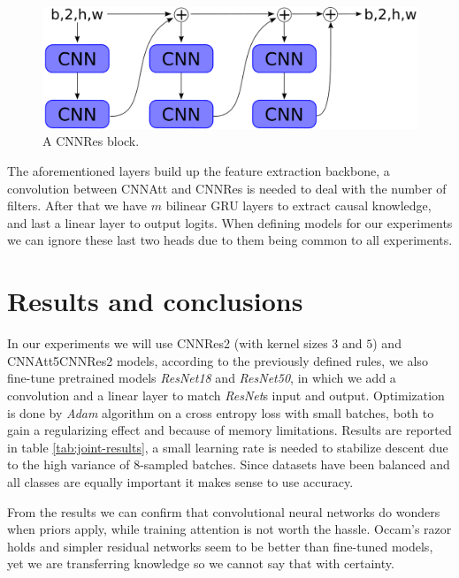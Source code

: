 \documentclass{article}
\begin{document}
\begin{figure}
    \centering
    \includegraphics[scale=.25]{images/cnn_res.png}
    \caption{A CNNRes block.}
    \label{fig:cnnres}
\end{figure}

The aforementioned layers build up the feature extraction backbone, a convolution between CNNAtt and CNNRes is needed to deal with the number of filters.
After that we have $m$ bilinear GRU layers to extract causal knowledge, and last a linear layer to output logits.
When defining models for our experiments we can ignore these last two heads due to them being common to all experiments.

\section{Results and conclusions}
In our experiments we will use CNNRes2 (with kernel sizes $3$ and $5$) and CNNAtt5CNNRes2 models, according to the previously defined rules, we also fine-tune pretrained models \textit{ResNet18} and \textit{ResNet50}, in which we add a convolution and a linear layer to match \textit{ResNet}s input and output.
Optimization is done by \textit{Adam} algorithm on a cross entropy loss with small batches, both to gain a regularizing effect and because of memory limitations.
Results are reported in table \ref{tab:joint-results}, a small learning rate is needed to stabilize descent due to the high variance of 8-sampled batches.
Since datasets have been balanced and all classes are equally important it makes sense to use accuracy.

From the results we can confirm that convolutional neural networks do wonders when priors apply, while training attention is not worth the hassle. 
Occam's razor holds and simpler residual networks seem to be better than fine-tuned models, yet we are transferring knowledge so we cannot say that with certainty. 
\end{document}
